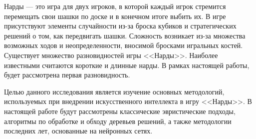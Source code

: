 Нарды --- это игра для двух игроков, в которой каждый игрок стремится перемещать свои шашки по доске и в конечном итоге выбить их. В игре присутствуют элементы случайности из-за броска кубиков и стратегических решений о том, как передвигать шашки. Сложность возникает из-за множества возможных ходов и неопределенности, вносимой бросками игральных костей. Существует множество разновидностей игры <<Нарды>>. Наиболее известными считаются короткие и длинные нарды. В рамках настоящей работы, будет рассмотрена первая разновидность.

Целью данного исследования является изучение основных методологий, используемых при внедрении искусственного интеллекта в игру <<Нарды>>. В настоящей работе будут рассмотрены классические эвристические подходы, алгоритмы по обработке и обходу деревьев решений, а также методологии последних лет, основанные на нейронных сетях.
